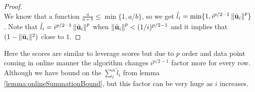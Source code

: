 \begin{proof}{\label{proof:onlineSensitivityBound}}
\begin{equation}
\end{equation}
We know that a function $\frac{a}{a+b} \leq \min\{1,a/b\}$, so we get $\tilde{l}_{i} = \min\{1,i^{p/2-1}\left\lVert\tilde{\mathbf{u}}_{i}\right\rVert^{p}\}$. Note that $\tilde{l}_{i} = i^{p/2-1}\left\lVert\tilde{\mathbf{u}}_{i}\right\rVert^{p}$ when $\left\lVert\tilde{\mathbf{u}}_{i}\right\rVert^{p} < (1/i)^{p/2-1}$ and it implies that $(1-\|\tilde{\mathbf{u}}_{i}\|^{2})$ close to $1$.
% 
\end{proof}
% 
Here the scores are similar to leverage scores \cite{woodruff2014sketching} but due to $p$ order and data point coming in online manner the algorithm changes $i^{p/2-1}$ factor more for every row. Although we have bound on the $\sum_{i}^{n} \tilde{l}_{i}$ from lemma \ref{lemma:onlineSummationBound}, but this factor can be very huge as $i$ increases.
